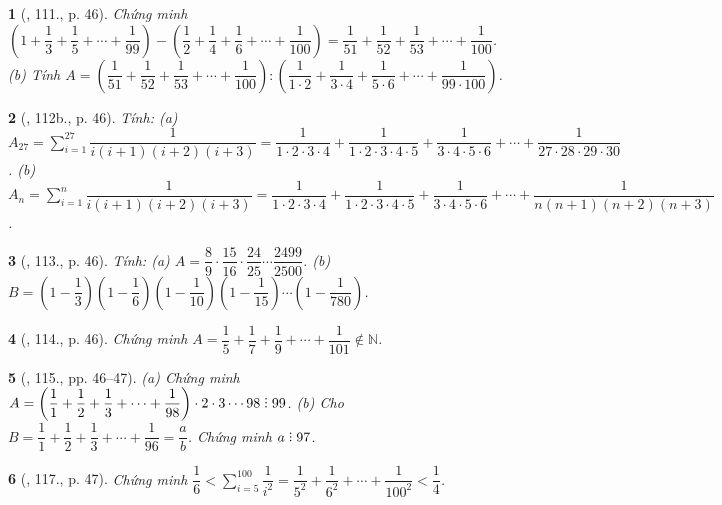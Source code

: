 \documentclass{article}
\newtheorem{baitoan}{}
\DeclareRobustCommand{\divby}{%
	\mathrel{\vbox{\baselineskip.65ex\lineskiplimit0pt\hbox{.}\hbox{.}\hbox{.}}}%
}
\begin{document}
\begin{baitoan}[\cite{Binh_Toan_6_tap_2}, 111., p. 46]
	Chứng minh $\left(1 + \dfrac{1}{3} + \dfrac{1}{5} + \cdots + \dfrac{1}{99}\right) - \left(\dfrac{1}{2} + \dfrac{1}{4} + \dfrac{1}{6} + \cdots + \dfrac{1}{100}\right) = \dfrac{1}{51} + \dfrac{1}{52} + \dfrac{1}{53} + \cdots + \dfrac{1}{100}$. (b) Tính $A = \left(\dfrac{1}{51} + \dfrac{1}{52} + \dfrac{1}{53} + \cdots + \dfrac{1}{100}\right):\left(\dfrac{1}{1\cdot2} + \dfrac{1}{3\cdot4} + \dfrac{1}{5\cdot6} + \cdots + \dfrac{1}{99\cdot100}\right)$.
\end{baitoan}

\begin{baitoan}[\cite{Binh_Toan_6_tap_2}, 112b., p. 46]
	Tính: (a) $A_{27} = \sum_{i=1}^{27} \dfrac{1}{i(i + 1)(i + 2)(i + 3)} = \dfrac{1}{1\cdot2\cdot3\cdot4} + \dfrac{1}{1\cdot2\cdot3\cdot4\cdot5} + \dfrac{1}{3\cdot4\cdot5\cdot6} + \cdots + \dfrac{1}{27\cdot28\cdot29\cdot30}$. (b) $A_n = \sum_{i=1}^n \dfrac{1}{i(i + 1)(i + 2)(i + 3)} = \dfrac{1}{1\cdot2\cdot3\cdot4} + \dfrac{1}{1\cdot2\cdot3\cdot4\cdot5} + \dfrac{1}{3\cdot4\cdot5\cdot6} + \cdots + \dfrac{1}{n(n + 1)(n + 2)(n + 3)}$.
\end{baitoan}

\begin{baitoan}[\cite{Binh_Toan_6_tap_2}, 113., p. 46]
	Tính: (a) $A = \dfrac{8}{9}\cdot\dfrac{15}{16}\cdot\dfrac{24}{25}\cdots\dfrac{2499}{2500}$. (b) $B = \left(1 - \dfrac{1}{3}\right)\left(1 - \dfrac{1}{6}\right)\left(1 - \dfrac{1}{10}\right)\left(1 - \dfrac{1}{15}\right)\cdots\left(1 - \dfrac{1}{780}\right)$.
\end{baitoan}

\begin{baitoan}[\cite{Binh_Toan_6_tap_2}, 114., p. 46]
	Chứng minh $A = \dfrac{1}{5} + \dfrac{1}{7} + \dfrac{1}{9} + \cdots + \dfrac{1}{101}\notin\mathbb{N}$.
\end{baitoan}

\begin{baitoan}[\cite{Binh_Toan_6_tap_2}, 115., pp. 46--47]
	(a) Chứng minh $A = \left(\dfrac{1}{1} + \dfrac{1}{2} + \dfrac{1}{3} + \cdots + \dfrac{1}{98}\right)\cdot2\cdot3\cdots98\divby99$. (b) Cho $B = \dfrac{1}{1} + \dfrac{1}{2} + \dfrac{1}{3} + \cdots + \dfrac{1}{96} = \dfrac{a}{b}$. Chứng minh $a\divby97$.
\end{baitoan}

\begin{baitoan}[\cite{Binh_Toan_6_tap_2}, 117., p. 47]
	Chứng minh $\dfrac{1}{6} < \sum_{i=5}^{100} \dfrac{1}{i^2} = \dfrac{1}{5^2} + \dfrac{1}{6^2} + \cdots + \dfrac{1}{100^2} < \dfrac{1}{4}$.
\end{baitoan}
\end{document}
